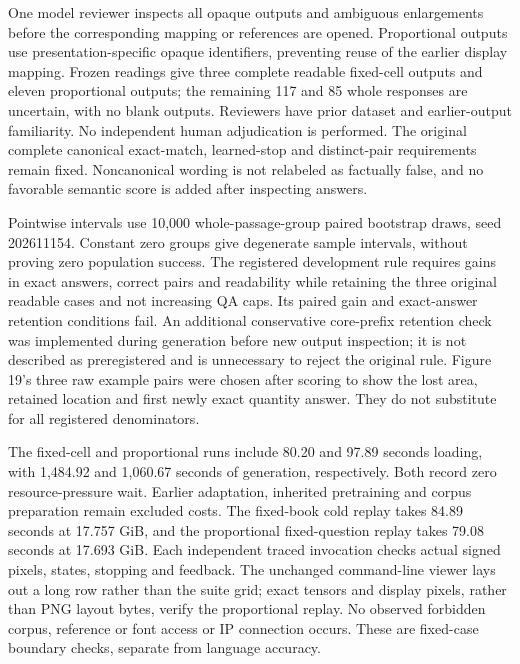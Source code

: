 One model reviewer inspects all opaque outputs and ambiguous enlargements
before the corresponding mapping or references are opened. Proportional
outputs use presentation-specific opaque identifiers, preventing reuse of
the earlier display mapping. Frozen readings give three complete readable
fixed-cell outputs and eleven proportional outputs; the remaining 117 and
85 whole responses are uncertain, with no blank outputs. Reviewers have
prior dataset and earlier-output familiarity. No independent human
adjudication is performed. The original complete canonical exact-match,
learned-stop and distinct-pair requirements remain fixed. Noncanonical
wording is not relabeled as factually false, and no favorable semantic score
is added after inspecting answers.

Pointwise intervals use 10,000 whole-passage-group paired bootstrap draws,
seed 202611154. Constant zero groups give degenerate sample intervals,
without proving zero population success. The registered development rule
requires gains in exact answers, correct pairs and readability while retaining
the three original readable cases and not increasing QA caps. Its paired
gain and exact-answer retention conditions fail. An additional conservative
core-prefix retention check was implemented during generation before new
output inspection; it is not described as preregistered and is unnecessary
to reject the original rule. Figure 19's three raw example pairs were chosen
after scoring to show the lost area, retained location and first newly exact
quantity answer. They do not substitute for all registered denominators.

The fixed-cell and proportional runs include 80.20 and 97.89 seconds loading,
with 1,484.92 and 1,060.67 seconds of generation, respectively. Both record
zero resource-pressure wait. Earlier adaptation, inherited pretraining and
corpus preparation remain excluded costs. The fixed-book cold replay takes
84.89 seconds at 17.757 GiB, and the proportional fixed-question replay takes
79.08 seconds at 17.693 GiB. Each independent traced invocation checks actual
signed pixels, states, stopping and feedback. The unchanged command-line
viewer lays out a long row rather than the suite grid; exact tensors and
display pixels, rather than PNG layout bytes, verify the proportional replay.
No observed forbidden corpus, reference or font access or IP connection occurs.
These are fixed-case boundary checks, separate from language accuracy.

